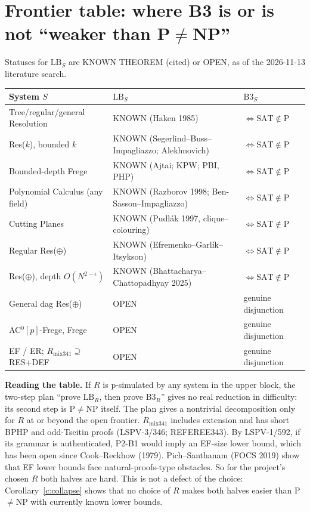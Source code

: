 \documentclass[11pt]{article}
\newcommand{\SAT}{\mathrm{SAT}}
\newcommand{\LB}{\mathrm{LB}}
\begin{document}
\section{Frontier table: where B3 is or is not ``weaker than P$\neq$NP''}
Statuses for $\LB_S$ are KNOWN THEOREM (cited) or OPEN, as of the 2026-11-13 literature search.
\begin{center}
\begin{tabular}{@{}lll@{}}
\toprule
System $S$ & $\LB_S$ & $\mathrm{B3}_S$ \\
\midrule
Tree/regular/general Resolution & KNOWN (Haken 1985) & $\iff\SAT\notin\mathrm P$\\
Res($k$), bounded $k$ & KNOWN (Segerlind--Buss--Impagliazzo; Alekhnovich) & $\iff\SAT\notin\mathrm P$\\
Bounded-depth Frege & KNOWN (Ajtai; KPW; PBI, PHP) & $\iff\SAT\notin\mathrm P$\\
Polynomial Calculus (any field) & KNOWN (Razborov 1998; Ben-Sasson--Impagliazzo) & $\iff\SAT\notin\mathrm P$\\
Cutting Planes & KNOWN (Pudl\'ak 1997, clique--colouring) & $\iff\SAT\notin\mathrm P$\\
Regular Res($\oplus$) & KNOWN (Efremenko--Garl\'ik--Itsykson) & $\iff\SAT\notin\mathrm P$\\
Res($\oplus$), depth $O(N^{2-\epsilon})$ & KNOWN (Bhattacharya--Chattopadhyay 2025) & $\iff\SAT\notin\mathrm P$\\
General dag Res($\oplus$) & OPEN & genuine disjunction\\
AC$^0[p]$-Frege, Frege & OPEN & genuine disjunction\\
EF / ER; $R_{\mathrm{mix341}}\supseteq$ RES+DEF & OPEN & genuine disjunction\\
\bottomrule
\end{tabular}
\end{center}

\noindent\textbf{Reading the table.} If $R$ is p-simulated by any system in the upper block, the
two-step plan ``prove $\LB_R$, then prove $\mathrm{B3}_R$'' gives no real reduction in difficulty: its
second step is P$\neq$NP itself. The plan gives a nontrivial decomposition only for $R$ at or beyond
the open frontier. $R_{\mathrm{mix341}}$ includes extension and has short BPHP and odd-Tseitin proofs
(LSPV-3/346; REFEREE343). By LSPV-1/592, if its grammar is authenticated, P2-B1 would imply an
EF-size lower bound, which has been open since Cook--Reckhow (1979). Pich--Santhanam (FOCS 2019)
show that EF lower bounds face natural-proofs-type obstacles. So for the project's chosen $R$ both
halves are hard. This is not a defect of the choice: Corollary~\ref{c:collapse} shows that no choice of
$R$ makes both halves easier than P$\neq$NP with currently known lower bounds.
\end{document}
